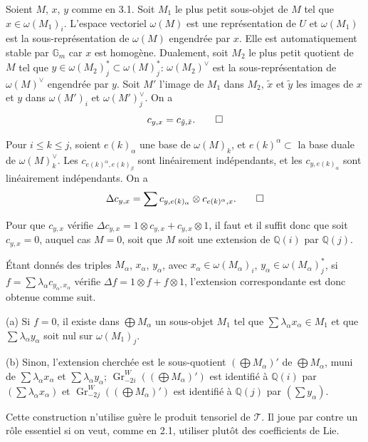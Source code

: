 \documentclass[12pt,a4paper]{article}
\theoremstyle{plain}
\theoremstyle{definition}
\theoremstyle{remark}
\newcommand{\Q}{\mathbb{Q}}
\newcommand{\Gm}{\mathbb{G}_m}
\begin{document}
Soient $M$, $x$, $y$ comme en 3.1. Soit $M_1$ le plus petit sous-objet de $M$ tel que $x\in\omega(M_1)_i$. L'espace vectoriel $\omega(M)$ est une repr\'esentation de $U$ et $\omega(M_1)$ est la sous-repr\'esentation de $\omega(M)$ engendr\'ee par $x$. Elle est automatiquement stable par $\Gm$ car $x$ est homog\`ene. Dualement, soit $M_2$ le plus petit quotient de $M$ tel que $y\in\omega(M_2)_j^*\subset\omega(M)_j^*$: $\omega(M_2)^\vee$ est la sous-repr\'esentation de $\omega(M)^\vee$ engendr\'ee par $y$. Soit $M'$ l'image de $M_1$ dans $M_2$, $\tilde{x}$ et $\tilde{y}$ les images de $x$ et $y$ dans $\omega(M')_i$ et $\omega(M')_j^\vee$. On a
\begin{equation*}
c_{y,x} = c_{\tilde{y},\tilde{x}}.\qedhere
\end{equation*}

Pour $i\leq k\leq j$, soient $e(k)_\alpha$ une base de $\omega(M)_k$, et $e(k)^\alpha\subset$ la base duale de $\omega(M)_k^\vee$. Les $c_{e(k)^\alpha,e(k)_\beta}$ sont lin\'eairement ind\'ependants, et les $c_{y,e(k)_\alpha}$ sont lin\'eairement ind\'ependants. On a
\begin{equation*}
\Delta c_{y,x} = \sum c_{y,e(k)_\alpha}\otimes c_{e(k)^\alpha,x}.\qedhere
\end{equation*}

Pour que $c_{y,x}$ v\'erifie $\Delta c_{y,x}=1\otimes c_{y,x}+c_{y,x}\otimes 1$, il faut et il suffit donc que soit $c_{y,x}=0$, auquel cas $M=0$, soit que $M$ soit une extension de $\Q(i)$ par $\Q(j)$.

\'Etant donn\'es des triples $M_\alpha$, $x_\alpha$, $y_\alpha$, avec $x_\alpha\in\omega(M_\alpha)_i$, $y_\alpha\in\omega(M_\alpha)_j^*$, si $f=\sum\lambda_\alpha c_{y_\alpha,x_\alpha}$ v\'erifie $\Delta f=1\otimes f+f\otimes 1$, l'extension correspondante est donc obtenue comme suit.

(a) Si $f=0$, il existe dans $\bigoplus M_\alpha$ un sous-objet $M_1$ tel que $\sum\lambda_\alpha x_\alpha\in M_1$ et que $\sum\lambda_\alpha y_\alpha$ soit nul sur $\omega(M_1)_j$.

(b) Sinon, l'extension cherch\'ee est le sous-quotient $(\bigoplus M_\alpha)'$ de $\bigoplus M_\alpha$, muni de $\sum\lambda_\alpha x_\alpha$ et $\sum\lambda_\alpha y_\alpha$; $\operatorname{Gr}_{-2i}^W((\bigoplus M_\alpha)')$ est identifi\'e {\`a} $\Q(i)$ par $(\sum\lambda_\alpha x_\alpha)$ et $\operatorname{Gr}_{-2j}^W((\bigoplus M_\alpha)')$ est identifi\'e {\`a} $\Q(j)$ par $(\sum y_\alpha)$.

Cette construction n'utilise gu\`ere le produit tensoriel de $\mathcal{T}$. Il joue par contre un r\^ole essentiel si on veut, comme en 2.1, utiliser plut\^ot des coefficients de Lie.
\end{document}
